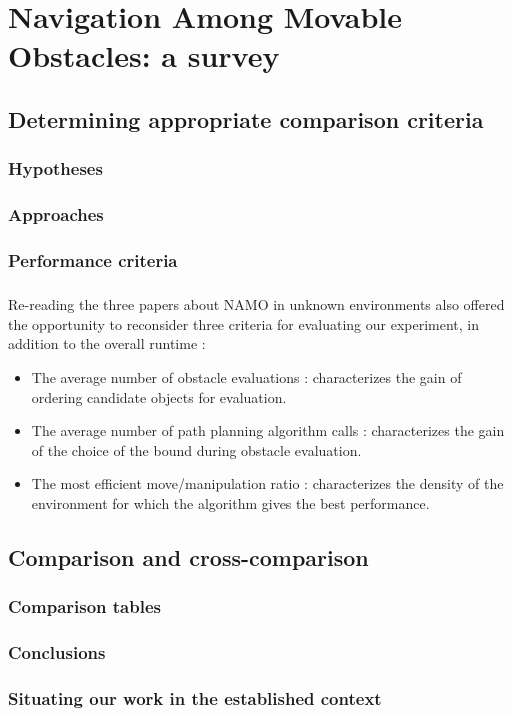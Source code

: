 
\chapter{Navigation Among Movable Obstacles: a survey} %

\label{Chapter2} %

\section{Determining appropriate comparison criteria}

\subsection{Hypotheses}

\subsection{Approaches}

\subsection{Performance criteria}

\paragraph{} Re-reading the three papers about NAMO in unknown environments also offered the opportunity to reconsider three criteria for evaluating our experiment, in addition to the overall runtime :

\begin{itemize}
  \item The average number of obstacle evaluations : characterizes the gain of ordering candidate objects for evaluation.
  \item The average number of path planning algorithm calls : characterizes the gain of the choice of the bound during obstacle evaluation.
  \item The most efficient move/manipulation ratio : characterizes the density of the environment for which the algorithm gives the best performance.
\end{itemize}

\section{Comparison and cross-comparison}

\subsection{Comparison tables}

\subsection{Conclusions}

\subsection{Situating our work in the established context}
